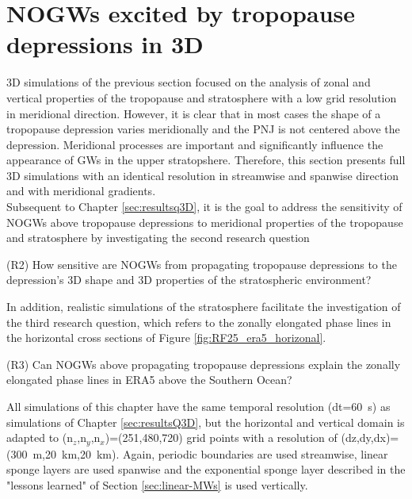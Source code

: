 \chapter{NOGWs excited by tropopause depressions in 3D}
\label{sec:results3D}
3D simulations of the previous section focused on the analysis of zonal and vertical properties of the tropopause and stratosphere with a low grid resolution in meridional direction. However, it is clear that in most cases the shape of a tropopause depression varies meridionally and the PNJ is not centered above the depression. Meridional processes are important and significantly influence the appearance of GWs in the upper stratopshere. Therefore, this section presents full 3D simulations with an identical resolution in streamwise and spanwise direction and with meridional gradients. \\
Subsequent to Chapter \ref{sec:resultsq3D}, it is the goal to address the sensitivity of NOGWs above tropopause depressions to meridional properties of the tropopause and stratosphere by investigating the second research question
\begin{tcolorbox}[]
    (R2) How sensitive are NOGWs from propagating tropopause depressions to the depression's 3D shape and 3D properties of the stratospheric environment?
\end{tcolorbox}
In addition, realistic simulations of the stratosphere facilitate the investigation of the third research question, which refers to the zonally elongated phase lines in the horizontal cross sections of Figure \ref{fig:RF25_era5_horizonal}.
\begin{tcolorbox}[]
    (R3) Can NOGWs above propagating tropopause depressions explain the zonally elongated phase lines in ERA5 above the Southern Ocean?
\end{tcolorbox} 
All simulations of this chapter have the same temporal resolution (dt=\SI{60}{\second}) as simulations of Chapter \ref{sec:resultsQ3D}, but the horizontal and vertical domain is adapted to (n$_z$,n$_y$,n$_x$)=(251,480,720) grid points with a resolution of (dz,dy,dx)=(\SI{300}{\meter},\SI{20}{\kilo\meter},\SI{20}{\kilo\meter}). Again, periodic boundaries are used streamwise, linear sponge layers are used spanwise and the exponential sponge layer described in the "lessons learned" of Section \ref{sec:linear-MWs} is used vertically.

